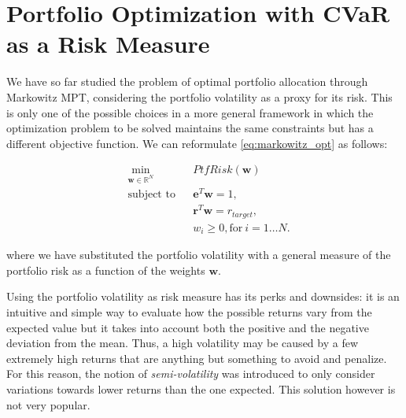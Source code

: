 \section{Portfolio Optimization with CVaR as a Risk Measure}
\label{sec:cvar_theory}

We have so far studied the problem of optimal portfolio allocation through Markowitz MPT, considering the portfolio volatility as a proxy for its risk.
This is only one of the possible choices in a more general framework in which the optimization problem to be solved maintains the same constraints but has a  different objective function. We can reformulate \eqref{eq:markowitz_opt} as follows:

\begin{subequations}
	\label{eq:general_opt}
	\begin{align}
	&\!\min_{\mathbf{w}\in \mathbb{R}^{N}}     &    & PtfRisk(\mathbf{w}) \\
	& \text{subject to}   &   & \mathbf{e}^T\mathbf{w} = 1 ,\\
	&                 &       & \mathbf{r}^T\mathbf{w} = r_{target},\label{eq:constraint2} \\
	&		   &      & w_{i} \geq 0, \text{for} \: i = 1\dots N. 
	\end{align}
\end{subequations}

where we have substituted the portfolio volatility with a general measure of the portfolio risk as a function of the weights $\mathbf{w}$.

Using the portfolio volatility as risk measure has its perks and downsides: it is an intuitive and simple way to evaluate how the possible returns vary from the expected value but it takes into account both the positive and the negative deviation from the mean. Thus, a high volatility may be caused by a few extremely high returns that are anything but something to avoid and penalize.
For this reason, the notion of \textit{semi-volatility} was introduced to only consider variations towards lower returns than the one expected. This solution however is not very popular.

